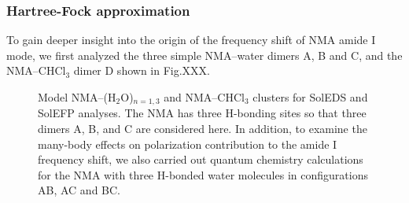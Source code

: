 \documentclass[a4paper,titlepage,twoside,fleqn,12pt]{book}
\begin{document}
\begin{refsection}
\subsubsection{Hartree-Fock approximation}

To gain deeper insight into the origin of the frequency
shift of NMA amide I mode, we first analyzed the three simple
NMA--water dimers A, B and C, and the NMA--CHCl$_3$ dimer D 
shown in Fig.XXX. 
%
\begin{figure}[t!]
\centering
\setlength\fboxsep{0.4pt}
\setlength\fboxrule{0.5pt}
\caption{
Model NMA--(H$_2$O)$_{n = 1,3}$ and NMA--CHCl$_3$ clusters 
for SolEDS and SolEFP analyses. The NMA has three H-bonding sites so that three dimers A, B, and C are
considered here. In addition, to examine the many\hyp{}body effects on polarization contribution 
to the amide I frequency shift, we also carried out quantum
chemistry calculations for the NMA with three H-bonded water molecules in configurations
AB, AC and BC.
\label{f:nma-abcde}}
\end{figure}
%


\end{refsection}
\end{document}

